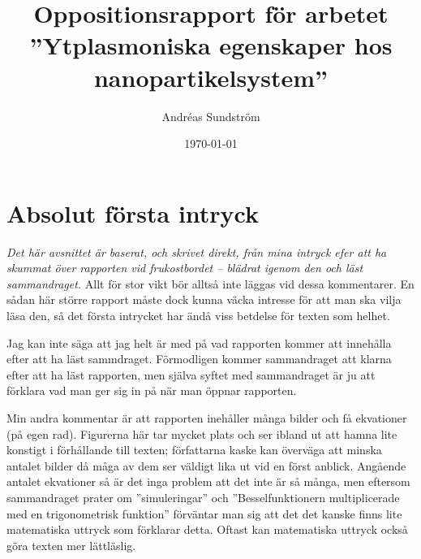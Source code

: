 \documentclass[11pt,a4paper, english, swedish
]{article}
\begin{document}
\title{Oppositionsrapport för arbetet 
\\''Ytplasmoniska egenskaper hos nanopartikelsystem'' }
\author{Andréas Sundström}
\date{\today}

\maketitle




\addtocounter{section}{-1}
\section{Absolut första intryck}
\small
\emph{Det här avsnittet är baserat, och skrivet direkt, från mina intryck efer att ha skummat över rapporten vid frukostbordet -- blädrat igenom den och läst sammandraget.} Allt för stor vikt bör alltså inte läggas vid dessa kommentarer. En sådan här större rapport måste dock kunna väcka intresse för att man ska vilja läsa den, så det första intrycket har ändå viss betdelse för texten som helhet.

Jag kan inte säga att jag helt är med på vad rapporten kommer att innehålla efter att ha läst sammdraget. Förmodligen kommer sammandraget att klarna efter att ha läst rapporten, men själva syftet med sammandraget är ju att förklara vad man ger sig in på när man öppnar rapporten.

Min andra kommentar är att rapporten inehåller många bilder och få ekvationer (på egen rad). Figurerna här tar mycket plats och ser ibland ut att hamna lite konstigt i förhållande till texten; författarna kaske kan överväga att minska antalet bilder då måga av dem ser väldigt lika ut vid en först anblick. Angående antalet ekvationer så är det inga problem att det inte är så många, men eftersom sammandraget prater om ''simuleringar'' och ''Besselfunktionern multiplicerade med en trigonometrisk funktion'' förväntar man sig att det det kanske finns lite matematiska uttryck som förklarar detta. Oftast kan matematiska uttryck också göra texten mer lättläslig.

\normalsize
\section{}



% 
\end{document}
